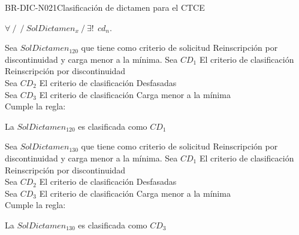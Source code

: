 \begin{BusinessRule}{BR-DIC-N021}{Clasificación de dictamen para el CTCE}
				\begin{center}
						$  \forall \: / \: \: / \:SolDictamen_{x} \: / \:  \exists! \: \: cd_{n} $. 
			\end{center}
		
		Sea $SolDictamen_{120} $ que tiene como criterio de solicitud Reinscripción por discontinuidad y carga menor a la mínima.
			Sea $CD_{1}$ El criterio de clasificación Reinscripción por discontinuidad \\
			Sea $CD_{2}$ El criterio de clasificación Desfasadas\\
			Sea $CD_{3}$ El criterio de clasificación Carga menor a la mínima \\
			Cumple la regla:
			\begin{center}
				La $SolDictamen_{120}$  es clasificada como $CD_{1}$
			\end{center}
		
			Sea $SolDictamen_{130} $ que tiene como criterio de solicitud Reinscripción por discontinuidad y carga menor a la mínima.
			Sea $CD_{1}$ El criterio de clasificación Reinscripción por discontinuidad \\
			Sea $CD_{2}$ El criterio de clasificación Desfasadas\\
			Sea $CD_{3}$ El criterio de clasificación Carga menor a la mínima \\
			Cumple la regla:
			\begin{center}
				La $SolDictamen_{130}$  es clasificada como $CD_{3}$
			\end{center}
			
		
\end{BusinessRule}

